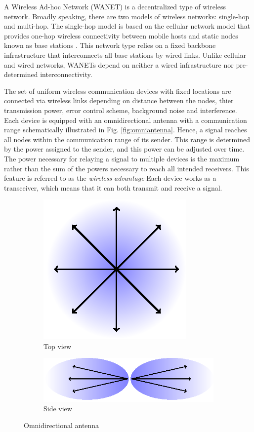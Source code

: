 A Wireless Ad-hoc Network (WANET) is a decentralized type of wireless network.
Broadly speaking, there are two models of wireless networks: single-hop and multi-hop.
The single-hop model is based on the cellular network model that provides one-hop wireless connectivity between mobile hosts and static nodes known as base stations \cite{clementi01}.
This network type relies on a fixed backbone infrastructure that interconnects all base stations by wired links.
Unlike cellular and wired networks, WANETs depend on neither a wired infrastructure nor pre-determined interconnectivity.

The set of uniform wireless communication devices with fixed locations are connected via wireless links depending on 
distance between the nodes, thier transmission power, error control scheme, background noise and interference.
Each device is equipped with an omnidirectional antenna with a communication range schematically illustrated in Fig. \ref{fig:omniantenna}.
Hence, a signal reaches all nodes within the communication range of its sender.
This range is determined by the power assigned to the sender, and this power can be adjusted over time.
The power necessary for relaying a signal to multiple devices is the maximum rather than the sum of the powers necessary to reach all intended receivers.
This feature is referred to as the \emph{wireless advantage} \cite{wieselthierXX}
Each device works as a transceiver, which means that it can both transmit and receive a signal.

\begin{figure}[htb!]
    \centering
    \begin{subfigure}[b]{0.35\textwidth}
        \includegraphics{figurer/omni-top.eps}
        \caption{Top view}
        \label{fig:omni-top}
    \end{subfigure}
    \begin{subfigure}[b]{0.55\textwidth}
        \includegraphics{figurer/omni-side.eps}
        \caption{Side view}
        \label{fig:omni-side}
    \end{subfigure}
  \label{fig:omni}
  \caption{Omnidirectional antenna}
\end{figure}

